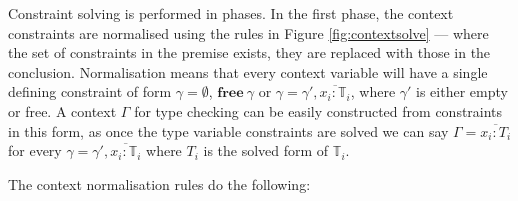 \documentclass[preprint]{sigplanconf}
\newcommand{\figref}[1]{Figure \ref{#1}}
\newcommand{\free}[1]{\mathbf{free}\:#1}
\begin{document}
Constraint solving is performed in phases. In the first phase, the context 
constraints
are normalised using the rules in \figref{fig:contextsolve} --- where the set of 
constraints in the premise exists, they are replaced with those in the 
conclusion. Normalisation means that every context variable will have a single 
defining constraint of form $\gamma = \emptyset$, $\free{\gamma}$ or
$\gamma = \gamma', \overline{x_i : \mathbb{T}_i}$, where $\gamma'$ is
either empty or free. A context $\Gamma$ for type checking can be easily
constructed from constraints in this form, as once the type variable
constraints are solved we can say $\Gamma = \overline{x_i : T_i}$ for
every $\gamma = \gamma', \overline{x_i : \mathbb{T}_i}$ where $T_i$ is the
solved form of $\mathbb{T}_i$.

The context normalisation rules do the following:
\end{document}
